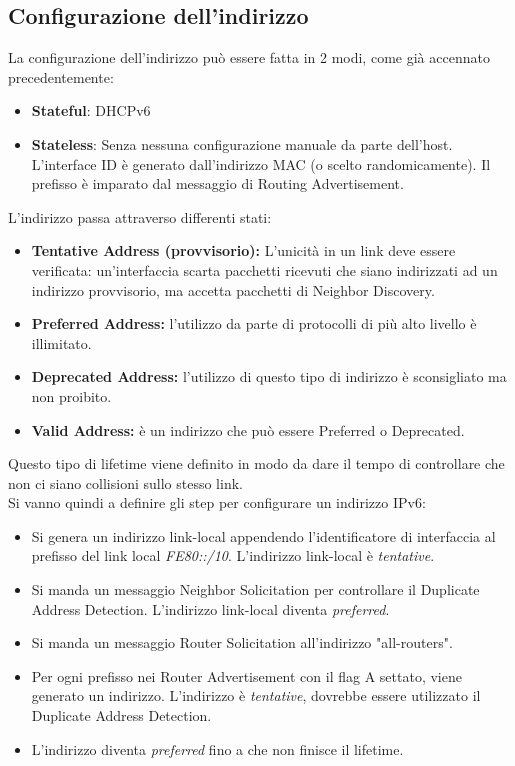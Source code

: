 \documentclass{article}
\begin{document}
\subsection{Configurazione dell'indirizzo}
La configurazione dell'indirizzo può essere fatta in 2 modi, come già accennato precedentemente:
\begin{itemize}
    \item \textbf{Stateful}: DHCPv6
    \item \textbf{Stateless}: Senza nessuna configurazione manuale da parte dell'host. \\ L'interface ID è generato dall'indirizzo MAC (o scelto randomicamente). Il prefisso è imparato dal messaggio di Routing Advertisement.
\end{itemize}
L'indirizzo passa attraverso differenti stati:
\begin{itemize}
    \item \textbf{Tentative Address (provvisorio):} L'unicità in un link deve essere verificata: un'interfaccia scarta pacchetti ricevuti che siano indirizzati ad un indirizzo provvisorio, ma accetta pacchetti di Neighbor Discovery.
    \item \textbf{Preferred Address:} l'utilizzo da parte di protocolli di più alto livello è illimitato.
    \item \textbf{Deprecated Address:} l'utilizzo di questo tipo di indirizzo è sconsigliato ma non proibito.
    \item \textbf{Valid Address:} è un indirizzo che può essere Preferred o Deprecated.
\end{itemize}
Questo tipo di lifetime viene definito in modo da dare il tempo di controllare che non ci siano collisioni sullo stesso link. \\ Si vanno quindi a definire gli step per configurare un indirizzo IPv6:
\begin{itemize}
    \item Si genera un indirizzo link-local appendendo l'identificatore di interfaccia al prefisso del link local \textit{FE80::/10}. L'indirizzo link-local è \textit{tentative}.
    \item Si manda un messaggio Neighbor Solicitation per controllare il Duplicate Address Detection. L'indirizzo link-local diventa \textit{preferred}.
    \item Si manda un messaggio Router Solicitation all'indirizzo "all-routers".
    \item Per ogni prefisso nei Router Advertisement con il flag A settato, viene generato un indirizzo. L'indirizzo è \textit{tentative}, dovrebbe essere utilizzato il Duplicate Address Detection.
    \item L'indirizzo diventa \textit{preferred} fino a che non finisce il lifetime.
\end{itemize}
\end{document}
